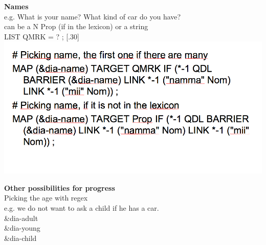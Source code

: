 \documentclass[landscape,norsk,11pt]{seminar}
\begin{document}
\begin{slide}
\newslide
\textbf{Names}\\
e.g. What is your name? What kind of car do you have?\\
can be a N Prop (if in the lexicon) or a string \\ LIST QMRK = ? ; 
\scalebox{.30}[.30]{\includegraphics{img/picking_name.png}}

\newslide
\textbf{Other possibilities for progress}\\
Picking the age with regex \\
e.g. we do not want to ask a child if he has a car. \\

\&dia-adult \\
\&dia-young \\
\&dia-child









\end{slide}
\end{document}

